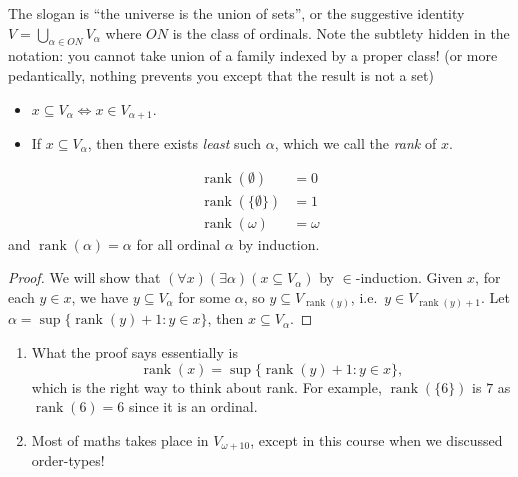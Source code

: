 \documentclass[a4paper]{article}
\DeclareMathOperator{\rank}{rank}
\begin{document}
The slogan is ``the universe is the union of sets'', or the suggestive identity \(V = \bigcup_{\alpha \in ON} V_\alpha\) where \(ON\) is the class of ordinals. Note the subtlety hidden in the notation: you cannot take union of a family indexed by a proper class! (or more pedantically, nothing prevents you except that the result is not a set)

\begin{note}\leavevmode
  \begin{itemize}
  \item \(x \subseteq V_\alpha \iff x \in V_{\alpha + 1}\).
  \item If \(x \subseteq V_\alpha\), then there exists \emph{least} such \(\alpha\), which we call the \emph{rank} of \(x\).
  \end{itemize}
\end{note}

\begin{eg}
  \begin{align*}
    \rank(\emptyset) &= 0 \\
    \rank(\{\emptyset\}) &= 1 \\
    \rank(\omega) &= \omega
  \end{align*}
  and \(\rank(\alpha) = \alpha\) for all ordinal \(\alpha\) by induction.
\end{eg}

\begin{proof}
  We will show that \((\forall x) (\exists \alpha) (x \subseteq V_\alpha)\) by \(\in\)-induction. Given \(x\), for each \(y \in x\), we have \(y \subseteq V_\alpha\) for some \(\alpha\), so \(y \subseteq V_{\rank(y)}\), i.e.\ \(y \in V_{\rank(y) + 1}\). 
  Let \(\alpha = \sup\{\rank(y) + 1: y \in x\}\), then \(x \subseteq V_\alpha\).
\end{proof}

\begin{remark}\leavevmode
  \begin{enumerate}
  \item What the proof says essentially is
    \[
      \rank(x) = \sup\{\rank(y) + 1: y \in x\},
    \]
    which is the right way to think about rank. For example, \(\rank(\{6\})\) is \(7\) as \(\rank(6) = 6\) since it is an ordinal.
  \item Most of maths takes place in \(V_{\omega + 10}\), except in this course when we discussed order-types!
  \end{enumerate}
\end{remark}
\end{document}
